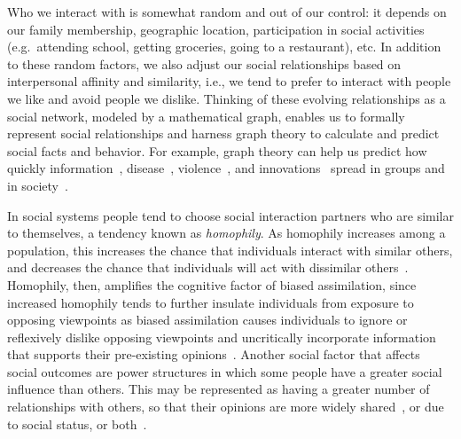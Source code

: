 Who we interact with is somewhat
random and out of our control: it depends on our family membership, geographic location, 
participation in social activities (e.g.\ attending school, getting
groceries, going to a restaurant), etc. In addition to these random factors, 
we also adjust our social relationships based on interpersonal affinity and similarity, 
i.e., we tend to prefer to interact with people we like and avoid people we dislike.
Thinking of these
evolving relationships as a social network, modeled by a mathematical graph,
enables us to formally represent social relationships and harness graph
theory to calculate and predict social facts and behavior. For example, graph
theory can help us predict how quickly information~\cite{Milgram1967,Travers1969}, 
disease~\cite{Salathe2010,Block2020}, violence~\cite{Epstein2002}, and
innovations~\cite{Deroiain2002,Acemoglu2011a,Kreindler2014}
spread in groups and in society~\cite{Milgram1967,Travers1969,Watts1999,Palla2007,Backstrom2012,Wohlgemuth2014}.

In social systems people tend to choose social interaction partners who 
are similar to themselves, a tendency known as \emph{homophily}. As homophily
increases among a population, this
increases the chance that individuals interact with similar others, 
and decreases the chance that individuals will act with dissimilar
others~\cite{McPherson2001}. Homophily, then, amplifies the cognitive factor of biased assimilation,
since increased homophily tends to further insulate individuals from
exposure to opposing viewpoints as biased assimilation causes individuals to 
ignore or reflexively dislike opposing viewpoints and uncritically incorporate
information that supports their pre-existing opinions~\cite{Mark2003,Dandekar2013}.
Another social factor that affects social outcomes are power structures
in which some people have a greater social influence than others.
This may be represented as having a greater number of relationships
with others, so that their opinions are more widely shared~\cite{French1956,Friedkin1986},
or due to social status, or both~\cite{DeGroot1974}.

